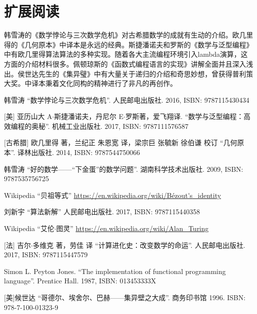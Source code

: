 \documentclass{article}
\begin{document}
\section{扩展阅读}

韩雪涛的《数学悖论与三次数学危机》\cite{HanXueTao16}对古希腊数学的成就有生动的介绍。欧几里得的《几何原本》中译本\cite{Elements}是永远的经典。斯捷潘诺夫和罗斯的《数学与泛型编程》\cite{StepanovRose15}中有欧几里得算法算法的多种实现。随着各大主流编程环境引入lambda演算，这方面的介绍材料很多。佩顿琼斯的《函数式编程语言的实现》\cite{SPJ1987}讲解全面并且深入浅出。侯世达先生的《集异璧》\cite{GEB}中有大量关于递归的介绍和奇思妙想，曾获得普利策大奖。中译本秉着文化同构的精神进行了非凡的再创作。

\ifx\wholebook\relax \else
\begin{thebibliography}{99}

韩雪涛 ``数学悖论与三次数学危机''. 人民邮电出版社. 2016, ISBN: 9787115430434

[美] 亚历山大 A$\cdot$斯捷潘诺夫，丹尼尔 E$\cdot$罗斯著，爱飞翔译. ``数学与泛型编程：高效编程的奥秘''. 机械工业出版社. 2017, ISBN: 9787111576587

[古希腊] 欧几里得 著，兰纪正 朱恩宽 译，梁宗巨 张毓新 徐伯谦 校订 ``几何原本''. 译林出版社. 2014, ISBN: 9787544750066

韩雪涛 ``好的数学——“下金蛋”的数学问题''. 湖南科学技术出版社. 2009, ISBN: 9787535756725

Wikipedia ``贝祖等式'' \url{https://en.wikipedia.org/wiki/Bézout's_identity}

刘新宇 ``算法新解'' 人民邮电出版社. 2017, ISBN: 9787115440358

Wikipedia ``艾伦$\cdot$图灵'' \url{https://en.wikipedia.org/wiki/Alan_Turing}

[法] 吉尔$\cdot$多维克 著，劳佳 译 ``计算进化史：改变数学的命运''. 人民邮电出版社. 2017, ISBN: 9787115447579

Simon L. Peyton Jones. ``The implementation of functional programming language''. Prentice Hall. 1987, ISBN: 013453333X

[美]候世达 ``哥德尔、埃舍尔、巴赫——集异壁之大成''. 商务印书馆 1996. ISBN: 978-7-100-01323-9

\end{thebibliography}

\expandafter\enddocument

\fi
\end{document}
